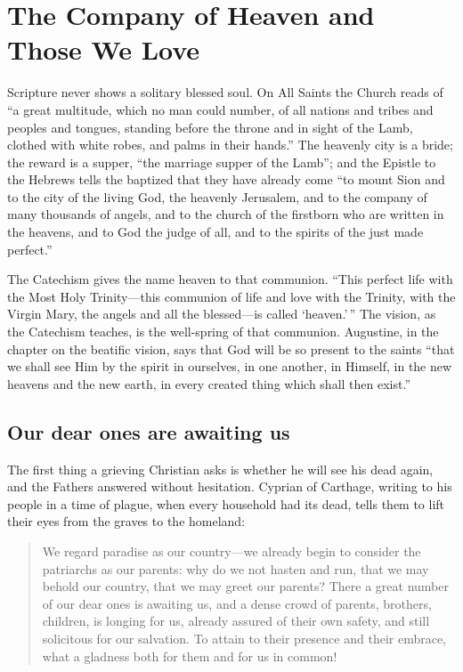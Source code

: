 \section{The Company of Heaven and Those We Love}

Scripture never shows a solitary blessed soul. On All Saints the Church reads of ``a great multitude, which no man could number, of all nations and tribes and peoples and tongues, standing before the throne and in sight of the Lamb, clothed with white robes, and palms in their hands.'' The heavenly city is a bride; the reward is a supper, ``the marriage supper of the Lamb''; and the Epistle to the Hebrews tells the baptized that they have already come ``to mount Sion and to the city of the living God, the heavenly Jerusalem, and to the company of many thousands of angels, and to the church of the firstborn who are written in the heavens, and to God the judge of all, and to the spirits of the just made perfect.''

The Catechism gives the name heaven to that communion. ``This perfect life with the Most Holy Trinity---this communion of life and love with the Trinity, with the Virgin Mary, the angels and all the blessed---is called `heaven.'\,'' The vision, as the Catechism teaches, is the well-spring of that communion. Augustine, in the chapter on the beatific vision, says that God will be so present to the saints ``that we shall see Him by the spirit in ourselves, in one another, in Himself, in the new heavens and the new earth, in every created thing which shall then exist.''

\subsection{Our dear ones are awaiting us}

The first thing a grieving Christian asks is whether he will see his dead again, and the Fathers answered without hesitation. Cyprian of Carthage, writing to his people in a time of plague, when every household had its dead, tells them to lift their eyes from the graves to the homeland:

\begin{quote}
We regard paradise as our country---we already begin to consider the patriarchs as our parents: why do we not hasten and run, that we may behold our country, that we may greet our parents? There a great number of our dear ones is awaiting us, and a dense crowd of parents, brothers, children, is longing for us, already assured of their own safety, and still solicitous for our salvation. To attain to their presence and their embrace, what a gladness both for them and for us in common!
\end{quote}


